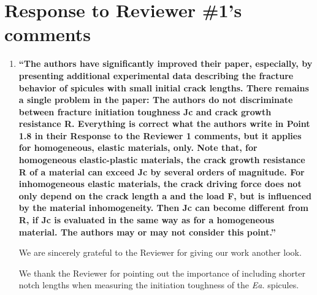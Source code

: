 \documentclass[11pt,letterpaper]{report}
\makeatletter
\newcommand{\EA}{\textit{Ea.\@}\xspace}
\makeatother
\begin{document}
\clearpage
\section*{Response to Reviewer \#1's comments}
\label{rev1}

\begin{enumerate}[label=\textit{1.\arabic*},wide, labelwidth=!, labelindent=0pt]
\item \label{r1c1} {\bf ``The authors have significantly improved their paper, especially, by presenting additional experimental data describing the fracture behavior of spicules with small initial crack lengths. There remains a single problem in the paper: The authors do not discriminate between fracture initiation toughness Jc and crack growth resistance R.
Everything is correct what the authors write in Point 1.8 in their Response to the Reviewer 1 comments, but it applies for homogeneous, elastic materials, only. Note that, for homogeneous elastic-plastic materials, the crack growth resistance R of a material can exceed Jc by several orders of magnitude. For inhomogeneous elastic materials, the crack driving force does not only depend on the crack length a and the load F, but is influenced by the material inhomogeneity. Then Jc can become different from R, if Jc is evaluated in the same way as for a homogeneous material. The authors may or may not consider this point.''}

We are sincerely grateful to the Reviewer for giving our work another look.


We thank the Reviewer for pointing out the importance of including shorter notch lengths when measuring the initiation toughness of the \EA spicules.






\end{enumerate}
\end{document}
